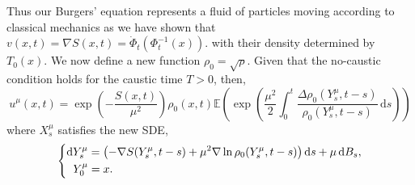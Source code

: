 \documentclass[a4paper,12pt,draft]{report}
\begin{document}
Thus our Burgers' equation represents a fluid of particles moving according to classical mechanics as we have shown that $v(x, t) = \nabla S(x, t) = \dot{\Phi}_t(\Phi_t^{-1}(x))$. with their density determined by $T_0(x)$.  We now define a new function $\rho_0 = \sqrt{\rho}$.
\theorem
{
Given that the no-caustic condition holds for the caustic time $T > 0$, then,
\begin{equation}
u^\mu(x, t) = \exp\left(-\frac{S(x, t)}{\mu^2}\right)\rho_0(x, t)\mathbb{E}\left(\exp\left(\frac{\mu^2}{2}\int_0^t\frac{\Delta\rho_0(Y_s^\mu, t - s)}{\rho_0(Y_s^\mu, t - s)}\,\mathrm{d}s\right)\right) \label{HOSEF}
\end{equation}
where $X_s^\mu$ satisfies the new SDE,
$$
\left\{
\begin{aligned}
& \mathrm{d}Y_s^\mu = \left(-\nabla S(Y_s^\mu, t - s) + \mu^2\nabla\ln\rho_0(Y_s^\mu, t - s)\right)\mathrm{d}s + \mu\,\mathrm{d}B_s,\\ 
& \hspace{0.2cm} Y_0^\mu = x.
\end{aligned}
\right.
$$
}
\proof
\end{document}
